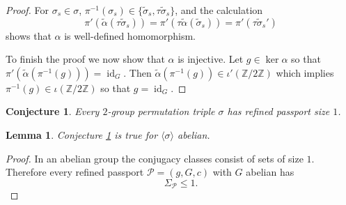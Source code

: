 \documentclass{dcthesis}
\newcommand{\ZZ}{\mathbb Z}
\newcommand{\mm}[1]{{\color{blue} \sf MM: [#1]}}
\newcommand{\wt}[1]{\widetilde{#1}}
\renewcommand{\ker}{\operatorname{ker}}
\DeclareMathOperator{\id}{id}
\numberwithin{equation}{section}
\newtheorem{conj}[equation]{Conjecture}
\newtheorem{lemma}[equation]{Lemma}
\theoremstyle{definition}
\theoremstyle{remark}
\begin{document}
{{{\begin{proof}
      For $\sigma_s\in\sigma$,
      $\pi^{-1}(\sigma_s)
      \in\{\wt{\sigma}_s,\tau\wt{\sigma}_s\}$,
      and the calculation
      \begin{equation}
        \label{eqn:alphawelldefined}
        \pi'(\wt{\alpha}(\tau\wt{\sigma}_s))
        =\pi'(\tau\wt{\alpha}(\wt{\sigma}_s))
        =\pi'(\tau\wt{\sigma}_s')
      \end{equation}
      shows that $\alpha$ is well-defined
      homomorphism.
      \par
      To finish the proof we now show that
      $\alpha$ is injective.
      Let $g\in\ker\alpha$
      so that
      $\pi'(\wt{\alpha}(\pi^{-1}(g)))=\id_G$.
      Then
      $\wt{\alpha}(\pi^{-1}(g))\in
      \iota'(\ZZ/2\ZZ)$
      which implies
      $\pi^{-1}(g)\in\iota(\ZZ/2\ZZ)$
      so that $g=\id_G$.
    \end{proof}
    \begin{conj}
      \label{conj:refinedpassportsizeone}
      Every $2$-group permutation triple $\sigma$
      has refined passport size $1$.
    \end{conj}
    \begin{lemma}
      \label{lem:conjectureabelian}
      Conjecture
      \ref{conj:refinedpassportsizeone}
      is true for
      $\langle\sigma\rangle$
      abelian.
    \end{lemma}
    \begin{proof}
      In an abelian group the conjugacy classes
      consist of sets of size $1$.
      Therefore every refined passport
      $\mathscr{P}=(g,G,c)$
      with $G$ abelian has
      \begin{equation}
        \label{eqn:leqone}
        \Sigma_{\mathscr{P}}\leq 1.

\end{equation}
\end{proof}}}}
\end{document}
